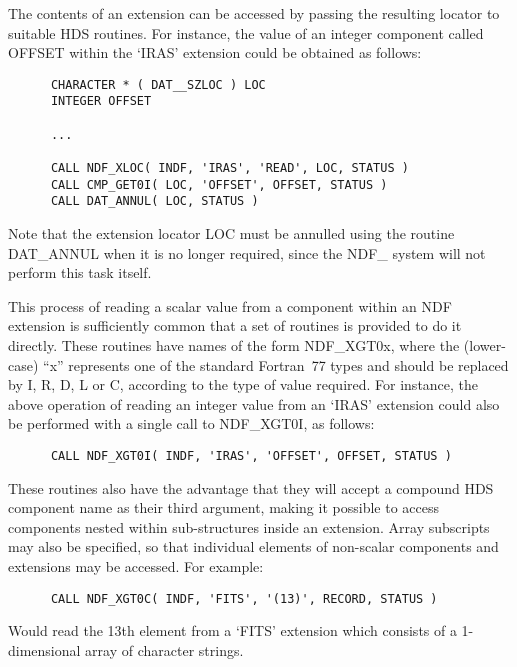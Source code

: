\documentclass[twoside,11pt]{article}
\newcommand{\htmlref}[2]{#1}
\newcommand{\xref}[3]{#1}
\begin{document}
The contents of an extension can be accessed by passing the resulting
locator to suitable \xref{HDS
routines}{sun92}{alphabetical_list_of_routines}.
For instance, the value of an integer component called OFFSET within the 
`IRAS' extension could be obtained as follows:

\small
\begin{verbatim}
      CHARACTER * ( DAT__SZLOC ) LOC
      INTEGER OFFSET

      ...

      CALL NDF_XLOC( INDF, 'IRAS', 'READ', LOC, STATUS )
      CALL CMP_GET0I( LOC, 'OFFSET', OFFSET, STATUS )
      CALL DAT_ANNUL( LOC, STATUS )
\end{verbatim}
\normalsize

Note that the extension locator LOC must be annulled using the routine
\xref{DAT\_ANNUL}{sun92}{DAT_ANNUL} when it is no longer required,
since the NDF\_ system will not perform this task itself.

This process of reading a scalar value from a component within an NDF
extension is sufficiently common that a set of routines is provided to do it
directly. 
These routines have names of the form \htmlref{NDF\_XGT0x}{NDF_XGT0x}, where the (lower-case)
``x'' represents one of the standard Fortran~77 types and should be replaced
by I, R, D, L or C, according to the type of value required. 
For instance, the above operation of reading an integer value from an `IRAS'
extension could also be performed with a single call to NDF\_XGT0I, as
follows: 

\small
\begin{verbatim}
      CALL NDF_XGT0I( INDF, 'IRAS', 'OFFSET', OFFSET, STATUS )
\end{verbatim}
\normalsize

These routines also have the advantage that they will accept a
compound HDS component name as their third argument, making it
possible to access components nested within sub-structures inside an
extension. Array subscripts may also be specified, so that individual
elements of non-scalar components and extensions may be accessed. For
example:

\small
\begin{verbatim}
      CALL NDF_XGT0C( INDF, 'FITS', '(13)', RECORD, STATUS )
\end{verbatim}
\normalsize

Would read the 13th element from a `FITS' extension which consists of
a 1-dimensional array of character strings.
\end{document}
